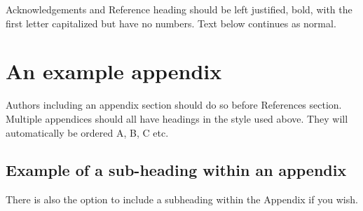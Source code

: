 \documentclass[5p,times,procedia]{elsarticle}
\begin{document}
Acknowledgements and Reference heading should be left justified, bold, with the first letter capitalized but have no numbers. Text below continues as normal.



\appendix
\section{An example appendix}
Authors including an appendix section should do so before References section. Multiple appendices should all have headings in the style used above. They will automatically be ordered A, B, C etc.

\subsection{Example of a sub-heading within an appendix}
There is also the option to include a subheading within the Appendix if you wish.


%
%



\end{document}
